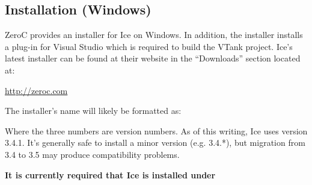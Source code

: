 \subsection{Installation (Windows)}

ZeroC provides an installer for Ice on Windows. In addition, the installer installs a plug-in for Visual Studio which is required to build the VTank project. Ice's latest installer can be found at their website in the ``Downloads'' section located at:

\url{http://zeroc.com}

The installer's name will likely be formatted as:


Where the three numbers are version numbers. As of this writing, Ice uses version 3.4.1. It's generally safe to install a minor version (e.g. 3.4.*), but migration from 3.4 to 3.5 may produce compatibility problems.

{\bf It is currently required that Ice is installed under }
